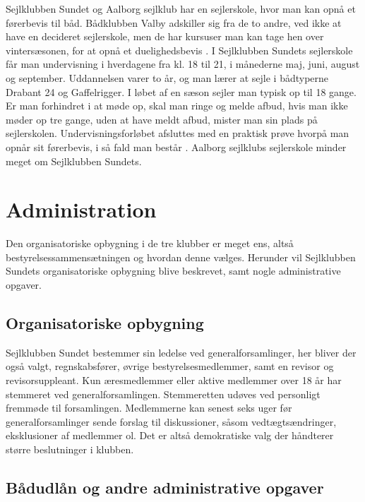 Sejlklubben Sundet og Aalborg sejlklub har en sejlerskole, hvor man kan opnå et førerbevis til båd. Bådklubben Valby
adskiller sig fra de to andre, ved ikke at have en decideret sejlerskole, men de har kursuser man kan tage hen over
vintersæsonen, for at opnå et duelighedsbevis \citep{baedklubben_valby_duelighedsbevis}. \newline 
I Sejlklubben Sundets sejlerskole får man undervisning i hverdagene fra kl. 18 til 21, i månederne maj, juni, august og
september. Uddannelsen varer to år, og man lærer at sejle i bådtyperne Drabant 24 og Gaffelrigger. I løbet af en sæson
sejler man typisk op til 18 gange. Er man forhindret i at møde op, skal man ringe og melde afbud, hvis man ikke møder op
tre gange, uden at have meldt afbud, mister man sin plads på sejlerskolen. Undervisningsforløbet afsluttes med en
praktisk prøve hvorpå man opnår sit førerbevis, i så fald man består \citep{Sundet}. Aalborg sejlklubs sejlerskole
minder meget om Sejlklubben Sundets.


\section{Administration}\label{sec:organisatoriske-opbygning}

Den organisatoriske opbygning i de tre klubber er meget ens, altså bestyrelsessammensætningen og hvordan denne vælges. 
Herunder vil Sejlklubben Sundets organisatoriske opbygning blive beskrevet, samt nogle administrative opgaver.


\subsection{Organisatoriske opbygning}\label{subsec:organisatoriske-opbygning}

Sejlklubben Sundet bestemmer sin ledelse ved generalforsamlinger, her bliver der også valgt, regnskabsfører, øvrige
bestyrelsesmedlemmer, samt en revisor og revisorsuppleant. Kun æresmedlemmer eller aktive medlemmer over 18 år har
stemmeret ved generalforsamlingen. Stemmeretten udøves ved personligt fremmøde til forsamlingen. Medlemmerne kan senest
seks uger før generalforsamlinger sende forslag til diskussioner, såsom vedtægtsændringer, eksklusioner af medlemmer ol.
Det er altså demokratiske valg der håndterer større beslutninger i klubben.


\subsection{Bådudlån og andre administrative opgaver}\label{subsec:bådudlån}

